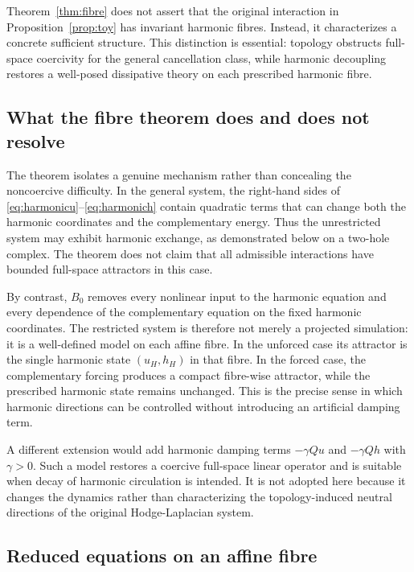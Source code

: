 \documentclass[11pt]{article}
\theoremstyle{remark}
\begin{document}
Theorem~\ref{thm:fibre} does not assert that the original interaction in Proposition~\ref{prop:toy} has invariant harmonic fibres. Instead, it characterizes a concrete sufficient structure. This distinction is essential: topology obstructs full-space coercivity for the general cancellation class, while harmonic decoupling restores a well-posed dissipative theory on each prescribed harmonic fibre.

\subsection{What the fibre theorem does and does not resolve}

The theorem isolates a genuine mechanism rather than concealing the noncoercive difficulty. In the general system, the right-hand sides of \eqref{eq:harmonicu}--\eqref{eq:harmonich} contain quadratic terms that can change both the harmonic coordinates and the complementary energy. Thus the unrestricted system may exhibit harmonic exchange, as demonstrated below on a two-hole complex. The theorem does not claim that all admissible interactions have bounded full-space attractors in this case.

By contrast, $B_0$ removes every nonlinear input to the harmonic equation and every dependence of the complementary equation on the fixed harmonic coordinates. The restricted system is therefore not merely a projected simulation: it is a well-defined model on each affine fibre. In the unforced case its attractor is the single harmonic state $(u_H,h_H)$ in that fibre. In the forced case, the complementary forcing produces a compact fibre-wise attractor, while the prescribed harmonic state remains unchanged. This is the precise sense in which harmonic directions can be controlled without introducing an artificial damping term.

A different extension would add harmonic damping terms $-\gamma Qu$ and $-\gamma Qh$ with $\gamma>0$. Such a model restores a coercive full-space linear operator and is suitable when decay of harmonic circulation is intended. It is not adopted here because it changes the dynamics rather than characterizing the topology-induced neutral directions of the original Hodge-Laplacian system.

\subsection{Reduced equations on an affine fibre}
\end{document}
